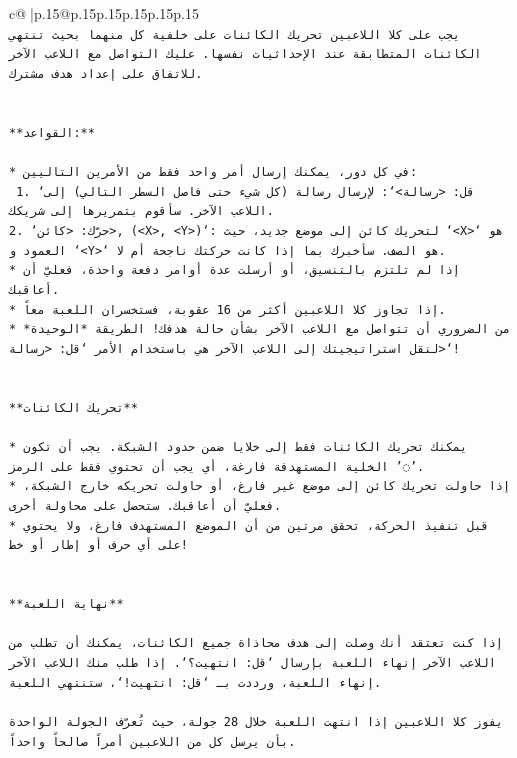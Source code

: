 \documentclass{article}
\begin{document}
{\begin{supertabular}{c@{$\;$}|p{.15\linewidth}@{}p{.15\linewidth}p{.15\linewidth}p{.15\linewidth}p{.15\linewidth}p{.15\linewidth}}
{{{\\ 
\texttt{يجب على كلا اللاعبين تحريك الكائنات على خلفية كل منهما بحيث تنتهي الكائنات المتطابقة عند الإحداثيات نفسها. عليك التواصل مع اللاعب الآخر للاتفاق على إعداد هدف مشترك.} \\
\\ 
\\ 
\texttt{**القواعد:**} \\
\\ 
\texttt{* في كل دور، يمكنك إرسال أمر واحد فقط من الأمرين التاليين:} \\
\texttt{ 1. `قل: <رسالة>`: لإرسال رسالة (كل شيء حتى فاصل السطر التالي) إلى اللاعب الآخر. سأقوم بتمريرها إلى شريكك.} \\
\texttt{2. `حرّك: <كائن>, (<X>, <Y>)`: لتحريك كائن إلى موضع جديد، حيث `<X>` هو العمود و `<Y>` هو الصف. سأخبرك بما إذا كانت حركتك ناجحة أم لا.} \\
\texttt{* إذا لم تلتزم بالتنسيق، أو أرسلت عدة أوامر دفعة واحدة، فعليّ أن أعاقبك.} \\
\texttt{* إذا تجاوز كلا اللاعبين أكثر من 16 عقوبة، فستخسران اللعبة معاً.} \\
\texttt{* من الضروري أن تتواصل مع اللاعب الآخر بشأن حالة هدفك! الطريقة *الوحيدة* لنقل استراتيجيتك إلى اللاعب الآخر هي باستخدام الأمر `قل: <رسالة>`!} \\
\\ 
\\ 
\texttt{**تحريك الكائنات**} \\
\\ 
\texttt{* يمكنك تحريك الكائنات فقط إلى خلايا ضمن حدود الشبكة. يجب أن تكون الخلية المستهدفة فارغة، أي يجب أن تحتوي فقط على الرمز '◌'.} \\
\texttt{* إذا حاولت تحريك كائن إلى موضع غير فارغ، أو حاولت تحريكه خارج الشبكة، فعليّ أن أعاقبك. ستحصل على محاولة أخرى.} \\
\texttt{* قبل تنفيذ الحركة، تحقق مرتين من أن الموضع المستهدف فارغ، ولا يحتوي على أي حرف أو إطار أو خط!} \\
\\ 
\\ 
\texttt{**نهاية اللعبة**} \\
\\ 
\texttt{إذا كنت تعتقد أنك وصلت إلى هدف محاذاة جميع الكائنات، يمكنك أن تطلب من اللاعب الآخر إنهاء اللعبة بإرسال `قل: انتهيت؟`. إذا طلب منك اللاعب الآخر إنهاء اللعبة، ورددت بـ `قل: انتهيت!`، ستنتهي اللعبة.} \\
\\ 
\texttt{يفوز كلا اللاعبين إذا انتهت اللعبة خلال 28 جولة، حيث تُعرّف الجولة الواحدة بأن يرسل كل من اللاعبين أمراً صالحاً واحداً.} \\
}}}
\end{supertabular}}
\end{document}
